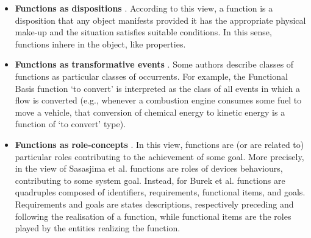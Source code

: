 \documentclass[
]{ceurart}
\begin{document}
\begin{itemize}
  \item \textbf{Functions as dispositions} \cite{arpFunctionRoleDisposition2008, barryBasicFormalOntology2015}. According to this view, a function is a disposition that any object manifests provided it has the appropriate physical make-up and the situation satisfies suitable conditions. In this sense, functions inhere in the object, like properties. 
  \item \textbf{Functions as transformative events} \cite{borgoFormalizationFunctionsOperations2011, garbaczTwoOntologydrivenFormalisations2011, garbaczStandardTaxonomyArtifact2005}.
  Some authors describe classes of functions as particular classes of occurrents. For example, the Functional Basis function `to convert' is interpreted as the class of all events in which a flow is converted (e.g., whenever a combustion engine consumes some fuel to move a vehicle, that conversion of chemical energy to kinetic energy is a function of `to convert' type).%
  \item \textbf{Functions as role-concepts} \cite{sasajimaFBRLFunctionBehavior1995,burekToplevelOntologyFunctions2006}. In this view, functions are (or are related to) particular roles contributing to the achievement of some goal. More precisely, in the view of Sasasjima et al. \cite{sasajimaFBRLFunctionBehavior1995} functions are roles of devices behaviours, contributing to some system goal. Instead, for Burek et al. \cite{burekToplevelOntologyFunctions2006} functions are quadruples composed of identifiers, requirements, functional items, and goals. Requirements and goals are states descriptions, respectively preceding and following the realisation of a function, while functional items are the roles played by the entities realizing the function. 
\end{itemize}
\end{document}

